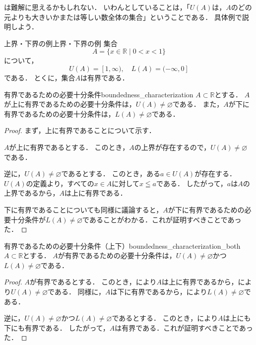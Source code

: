 は難解に思えるかもしれない．
いわんとしていることは，「$U(A)$は，$A$のどの元よりも大きいかまたは等しい数全体の集合」ということである．
具体例で説明しよう．

\begin{example}{上界・下界の例}{上界・下界の例}
  集合
  \[
    A = \{ x \in \mathbb{R} \mid 0 < x < 1 \}
  \]
  について，
  \[
    U(A) = [1,\infty),
    \quad
    L(A) = (-\infty,0]
  \]
  である．
  とくに，集合$A$は有界である．
\end{example}

\begin{prop}{有界であるための必要十分条件}{boundedness_characterization}
  $A \subset \mathbb{R}$とする．
  $A$が上に有界であるための必要十分条件は，$U(A) \ne \varnothing$である．
  また，$A$が下に有界であるための必要十分条件は，$L(A) \ne \varnothing$である．
\end{prop}

\begin{tleftbar}
  \begin{proof}
    まず，上に有界であることについて示す．

    $A$が上に有界であるとする．
    このとき，$A$の上界が存在するので，$U(A) \ne \varnothing$である．

    逆に，$U(A) \ne \varnothing$であるとする．
    このとき，ある$a \in U(A)$が存在する．
    $U(A)$の定義より，すべての$x \in A$に対して$x \leqq a$である．
    したがって，$a$は$A$の上界であるから，$A$は上に有界である．

    下に有界であることについても同様に議論すると，$A$が下に有界であるための必要十分条件が$L(A) \ne \varnothing$であることがわかる．これが証明すべきことであった．
  \end{proof}
\end{tleftbar}

\begin{prop}{有界であるための必要十分条件（上下）}{boundedness_characterization_both}
  $A \subset \mathbb{R}$とする．
  $A$が有界であるための必要十分条件は，$U(A) \ne \varnothing$かつ$L(A) \ne \varnothing$である．
\end{prop}

\begin{tleftbar}
  \begin{proof}
    $A$が有界であるとする．
    このとき，により$A$は上に有界であるから，により$U(A) \ne \varnothing$である．
    同様に，$A$は下に有界であるから，により$L(A) \ne \varnothing$である．

    逆に，$U(A) \ne \varnothing$かつ$L(A) \ne \varnothing$であるとする．
    このとき，により$A$は上にも下にも有界である．
    したがって，$A$は有界である．これが証明すべきことであった．
  \end{proof}
\end{tleftbar}

